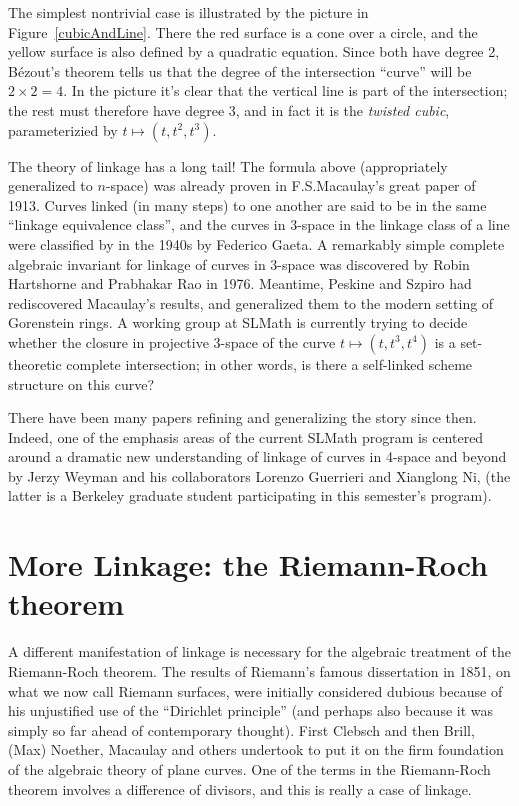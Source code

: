 \documentclass[11pt, oneside]{article}   	%
\begin{document}
The simplest nontrivial case is illustrated by the picture in
Figure~\ref{cubicAndLine}. There the red surface is a cone over a circle, and the yellow surface
is also defined by a quadratic equation. Since both have degree 2, B\'ezout's theorem tells us that the
degree of the intersection ``curve'' will be $2\times 2 = 4$. In the picture it's clear that the vertical line
is part of the intersection; the rest must therefore have degree 3, and in fact it is the \emph{twisted cubic},
parameterizied by $t\mapsto (t, t^{2}, t^{3})$.


The theory of linkage has a long tail! The formula above (appropriately generalized to $n$-space) was already proven in F.S.Macaulay's great paper of 1913. Curves linked (in many steps) to one another are said to be in the same ``linkage equivalence class'', and the curves in 3-space in the linkage class of a line were classified by in the 1940s by Federico Gaeta. A remarkably simple complete algebraic invariant for linkage of curves in 3-space was discovered by Robin Hartshorne and Prabhakar Rao in 1976. 
Meantime, Peskine and Szpiro had rediscovered Macaulay's results, and generalized them to the 
modern setting of Gorenstein rings. A working group at SLMath is currently trying to
decide whether the closure in projective 3-space of the curve $t \mapsto (t, t^{3}, t^{4})$ is a set-theoretic complete intersection; in other words, is there a self-linked scheme structure on this curve?

There have been many papers refining and generalizing the story since then. Indeed, one of the emphasis areas of the current SLMath program is centered around a dramatic new understanding of linkage of curves in 4-space and beyond by Jerzy Weyman and his collaborators
Lorenzo Guerrieri and Xianglong Ni, (the latter is a Berkeley graduate student participating in this semester's program).

\section{More Linkage: the Riemann-Roch theorem}
A different manifestation of linkage is necessary for the algebraic treatment of the Riemann-Roch theorem. The results of Riemann's famous dissertation in 1851, on what we now call Riemann surfaces, were initially considered
dubious because of his unjustified use of the ``Dirichlet principle'' (and perhaps also because it was simply so far ahead of contemporary thought). First Clebsch and then Brill, (Max) Noether, Macaulay and others undertook to put it on the firm foundation of the algebraic theory of plane curves. One of the terms in the Riemann-Roch theorem involves a difference of divisors, and this is really a case of linkage.
\end{document}
